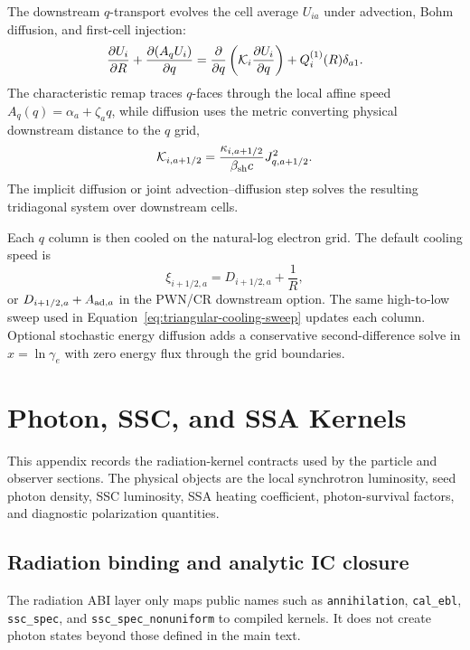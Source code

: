 \documentclass[twocolumn]{aastex702}
\begin{document}
The downstream \(q\)-transport evolves the cell average \(U_{ia}\) under
advection, Bohm diffusion, and first-cell injection:
\begin{equation}
\frac{\partial U_i}{\partial R}
+\frac{\partial(A_qU_i)}{\partial q}
=\frac{\partial}{\partial q}
\left({\cal K}_i\frac{\partial U_i}{\partial q}\right)
+Q_i^{(1)}(R)\delta_{a1}.
\end{equation}
The characteristic remap traces \(q\)-faces through the local affine speed
\(A_q(q)=\alpha_a+\zeta_aq\), while diffusion uses the metric converting physical
downstream distance to the \(q\) grid,
\begin{equation}
{\cal K}_{i,a+1/2}
=\frac{\kappa_{i,a+1/2}}{\beta_{\rm sh}c}J_{q,a+1/2}^{2}.
\end{equation}
The implicit diffusion or joint advection--diffusion step solves the resulting
tridiagonal system over downstream cells.

Each \(q\) column is then cooled on the natural-log electron grid.  The default
cooling speed is
\begin{equation}
\xi_{i+1/2,a}=D_{i+1/2,a}+\frac{1}{R},
\end{equation}
or \(D_{i+1/2,a}+A_{{\rm ad},a}\) in the PWN/CR downstream option.  The same
high-to-low sweep used in Equation~\eqref{eq:triangular-cooling-sweep} updates
each column.  Optional stochastic energy diffusion adds a conservative
second-difference solve in \(x=\ln\gamma_e\) with zero energy flux through the
grid boundaries.


\section{Photon, SSC, and SSA Kernels} \label{app:photon-kernels}

This appendix records the radiation-kernel contracts used by the particle and
observer sections.  The physical objects are the local synchrotron luminosity,
seed photon density, SSC luminosity, SSA heating coefficient, photon-survival
factors, and diagnostic polarization quantities.

\subsection{Radiation binding and analytic IC closure}

The radiation ABI layer only maps public names such as \texttt{annihilation},
\texttt{cal\_ebl}, \texttt{ssc\_spec}, and \texttt{ssc\_spec\_nonuniform} to
compiled kernels.  It does not create photon states beyond those defined in the
main text.
\end{document}

